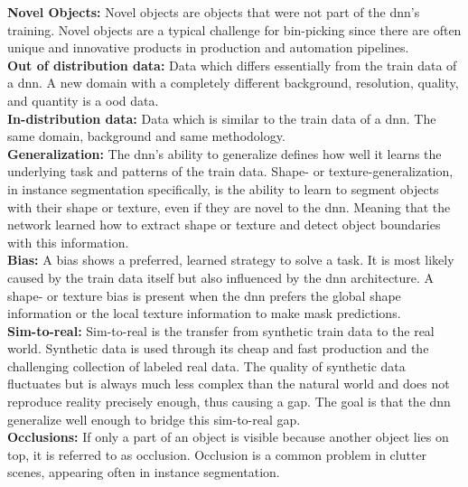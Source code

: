 		\textbf{Novel Objects:} Novel objects are objects that were not part of the \ac{dnn}'s training. Novel objects are a typical challenge for bin-picking since there are often unique and innovative products in production and automation pipelines.\\
		\textbf{Out of distribution data:} Data which differs essentially from the train data of a \ac{dnn}. A new domain with a completely different background, resolution, quality, and quantity is a \ac{ood} data.\\
		\textbf{In-distribution data:} Data which is similar to the train data of a \ac{dnn}. The same domain, background and same methodology.\\
		\textbf{Generalization:} The \ac{dnn}'s ability to generalize defines how well it learns the underlying task and patterns of the train data. Shape- or texture-generalization, in instance segmentation specifically, is the ability to learn to segment objects with their shape or texture, even if they are novel to the \ac{dnn}. Meaning that the network learned how to extract shape or texture and detect object boundaries with this information. \\
		\textbf{Bias:} A bias shows a preferred, learned strategy to solve a task. It is most likely caused by the train data itself but also influenced by the \ac{dnn} architecture. A shape- or texture bias is present when the \ac{dnn} prefers the global shape information or the local texture information to make mask predictions.\\
		\textbf{Sim-to-real:} Sim-to-real is the transfer from synthetic train data to the real world. Synthetic data is used through its cheap and fast production and the challenging collection of labeled real data. The quality of synthetic data fluctuates but is always much less complex than the natural world and does not reproduce reality precisely enough, thus causing a gap. The goal is that the \ac{dnn} generalize well enough to bridge this sim-to-real gap.\\
		\textbf{Occlusions:} If only a part of an object is visible because another object lies on top, it is referred to as occlusion. Occlusion is a common problem in clutter scenes, appearing often in instance segmentation.
		
	
	
